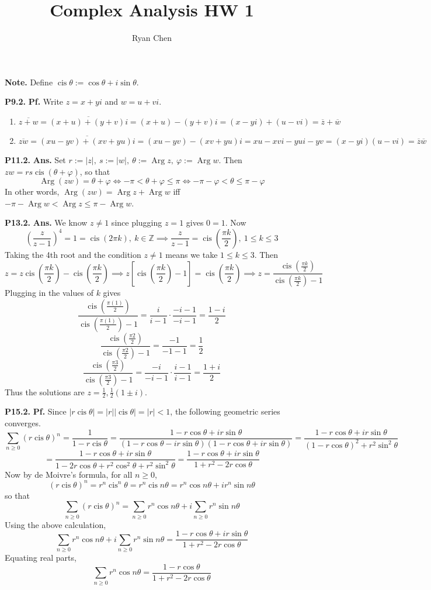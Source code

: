 \documentclass{article}
\title{Complex Analysis HW 1}
\author{Ryan Chen}
\date{}
\def\mbb#1{\mathbb{#1}}
\def\tbf#1{\textbf{#1}}
\def\bZ{\mbb{Z}}
\newcommand{\br}[1]{\left(#1\right)}
\newcommand{\sbr}[1]{\left[#1\right]}
\newcommand{\vp}{\varphi}
\renewcommand{\th}{\theta}
\newcommand{\ans}{\tbf{Ans. }}
\newcommand{\pf}{\tbf{Pf. }}
\newcommand{\imp}{\implies}
\newcommand{\sep}[1][.5cm]{\vspace{#1}}
\renewcommand{\bar}{\overline}
\DeclareMathOperator{\cis}{cis}
\DeclareMathOperator{\Arg}{Arg}
\begin{document}
	
\maketitle



\tbf{Note.} Define $\cis\theta:=\cos\theta+i\sin\theta$.
\sep

	

\tbf{P9.2.} \pf Write $z=x+yi$ and $w=u+vi$.

\begin{enumerate}
	
\item
$$\bar{z+w} = \bar{(x+u)+(y+v)i} = (x+u) - (y+v)i = (x-yi) + (u-vi) = \bar z + \bar w$$

\item
$$\bar{zw} = \bar{(xu-yv)+(xv+yu)i} = (xu-yv) - (xv+yu)i = xu - xvi - yui - yv = (x-yi)(u-vi) = \bar z\bar w$$

\end{enumerate}
\sep



\tbf{P11.2.} \ans Set $r:=|z|,~s:=|w|,~\theta:=\Arg z,~\vp:=\Arg w$. Then $zw=rs\cis(\theta+\vp)$, so that
$$\Arg(zw) = \theta+\vp
\iff -\pi < \theta+\vp \le \pi
\iff -\pi-\vp< \theta \le \pi-\vp$$
In other words, $\Arg(zw)=\Arg z+\Arg w$ iff $-\pi-\Arg w<\Arg z\le\pi-\Arg w$.
\sep



\tbf{P13.2.} \ans We know $z\ne1$ since plugging $z=1$ gives $0=1$. Now
$$\br{\frac{z}{z-1}}^4 = 1 = \cis(2\pi k),~k\in\bZ
\imp \frac{z}{z-1} = \cis\br{\frac{\pi k}{2}},~1\le k\le 3$$
Taking the 4th root and the condition $z\ne1$ means we take $1\le k\le 3$. Then
$$z = z\cis\br{\frac{\pi k}{2}} - \cis\br{\frac{\pi k}{2}}
\imp z\sbr{\cis\br{\frac{\pi k}{2}}-1} = \cis\br{\frac{\pi k}{2}}
\imp z = \frac{\cis\br{\frac{\pi k}{2}}}{\cis\br{\frac{\pi k}{2}}-1}$$
Plugging in the values of $k$ gives
$$\frac{\cis\br{\frac{\pi(1)}{2}}}{\cis\br{\frac{\pi (1)}{2}}-1}
= \frac{i}{i-1}\cdot\frac{-i-1}{-i-1}
= \frac{1-i}{2}$$
$$\frac{\cis\br{\frac{\pi 2}{2}}}{\cis\br{\frac{\pi 2}{2}}-1}
= \frac{-1}{-1-1}
= \frac12$$
$$\frac{\cis\br{\frac{\pi 3}{2}}}{\cis\br{\frac{\pi 3}{2}}-1}
= \frac{-i}{-i-1}\cdot\frac{i-1}{i-1}
= \frac{1+i}{2}$$
Thus the solutions are $z=\frac12,\frac12(1\pm i)$.
\sep



\tbf{P15.2.} \pf Since $|r\cis\th|=|r||\cis\th|=|r|<1$, the following geometric series converges.
$$\sum_{n\ge0}(r\cis\th)^n = \frac{1}{1-r\cis\th}
= \frac{1-r\cos\th+ir\sin\th}{(1-r\cos\th-ir\sin\th)(1-r\cos\th+ir\sin\th)}
= \frac{1-r\cos\th+ir\sin\th}{(1-r\cos\th)^2+r^2\sin^2\th}$$
$$= \frac{1-r\cos\th+ir\sin\th}{1-2r\cos\th+r^2\cos^2\th+r^2\sin^2\th}
= \frac{1-r\cos\th+ir\sin\th}{1+r^2-2r\cos\th}$$
Now by de Moivre's formula, for all $n\ge0$,
$$(r\cis\th)^n = r^n\cis^n\th = r^n\cis n\th = r^n\cos n\th+ir^n\sin n\th$$
so that
$$\sum_{n\ge0}(r\cis\th)^n = \sum_{n\ge0}r^n\cos n\th + i\sum_{n\ge0}r^n\sin n\th$$
Using the above calculation,
$$\sum_{n\ge0}r^n\cos n\th + i\sum_{n\ge0}r^n\sin n\th = \frac{1-r\cos\th+ir\sin\th}{1+r^2-2r\cos\th}$$
Equating real parts,
$$\sum_{n\ge0}r^n\cos n\th = \frac{1-r\cos\th}{1+r^2-2r\cos\th}$$
\sep
\end{document}

